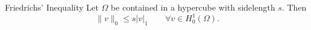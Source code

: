 \begin{thmx}{Friedrichs' Inequality}
Let $\Omega$ be contained in a hypercube with sidelength $s$. Then 
\begin{equation*}
    \| v \|_0 \leq s |v|_1 \quad \quad \forall v \in H_0^1(\Omega).
\end{equation*}
\end{thmx}
\begin{bev}

\end{bev}
